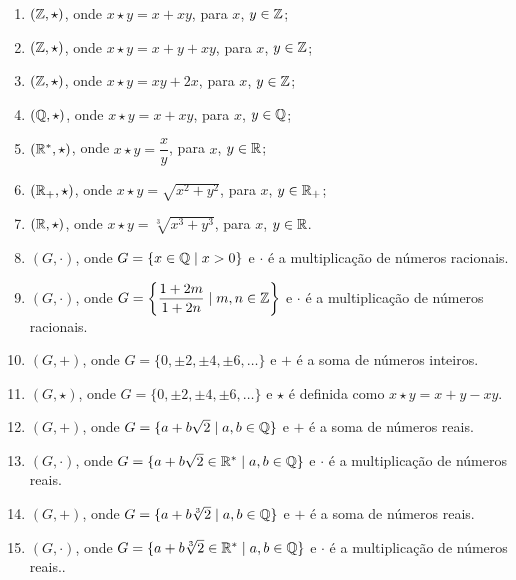 \documentclass[12pt]{exam}
\begin{document}
    \begin{enumerate}[label=({\alph*})]
        \item $(\mathbb{Z}, \star)$, onde $x \star y = x + xy$, para $x$, $y \in \mathbb{Z}$;

        \item $(\mathbb{Z}, \star)$, onde $x \star y = x + y + xy$, para $x$, $y \in \mathbb{Z}$;

        \item $(\mathbb{Z}, \star)$, onde $x \star y = xy + 2x$, para $x$, $y \in \mathbb{Z}$;

        \item $(\mathbb{Q}, \star)$, onde $x \star y = x + xy$, para $x$, $y \in \mathbb{Q}$;

        \item $(\mathbb{R}^*, \star)$, onde $x \star y = \dfrac{x}{y}$, para $x$, $y \in \mathbb{R}$;

        \item $(\mathbb{R}_+, \star)$, onde $x \star y = \sqrt{x^2 + y^2}$, para $x$, $y \in \mathbb{R}_+$;

        \item $(\mathbb{R}, \star)$, onde $x \star y = \sqrt[3]{x^3 + y^3}$, para $x$, $y \in \mathbb{R}$.

        \item $(G, \cdot)$, onde $G = \{x \in \mathbb{Q} \mid x > 0\}$ e $\cdot$ é a multiplicação de números racionais.

        \item $(G, \cdot)$, onde $G = \left\{\dfrac{1 + 2m}{1 + 2n} \mid m, n \in \mathbb{Z}\right\}$ e $\cdot$ é a multiplicação de números racionais.

        \item $(G, +)$, onde $G = \{0, \pm 2, \pm 4, \pm 6, \dots\}$ e $+$ é a soma de números inteiros.

        \item $(G, \star)$, onde $G = \{0, \pm 2, \pm 4, \pm 6, \dots\}$ e $\star$ é definida como $x \star y = x + y - xy$.

        \item $(G, +)$, onde $G = \{a + b\sqrt{2} \mid a, b \in \mathbb{Q}\}$ e $+$ é a soma de números reais.

        \item $(G, \cdot)$, onde $G = \{a + b\sqrt{2} \in \mathbb{R}^* \mid a, b \in \mathbb{Q}\}$ e $\cdot$ é a multiplicação de números reais.

        \item $(G, +)$, onde $G = \{a + b\sqrt[3]{2} \mid a, b \in \mathbb{Q}\}$ e $+$ é a soma de números reais.

        \item $(G, \cdot)$, onde $G = \{a + b\sqrt[3]{2} \in \mathbb{R}^* \mid a, b \in \mathbb{Q}\}$ e $\cdot$ é a multiplicação de números reais..
    \end{enumerate}
\end{document}
